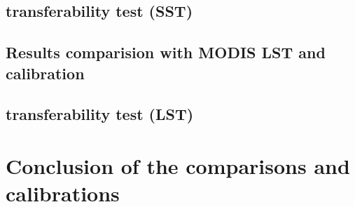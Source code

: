 
\subsection{transferability test (SST)}


\subsection{Results comparision with MODIS LST and calibration}


\subsection{transferability test (LST)}


\section{Conclusion of the comparisons and calibrations}









